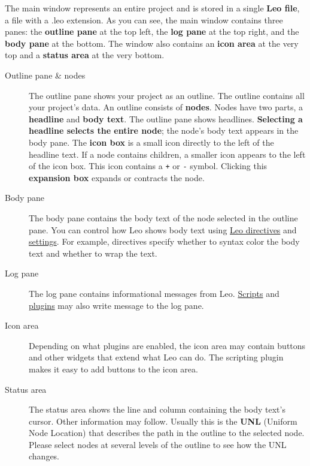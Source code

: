 \documentclass[10pt,a4paper,english]{article}
\begin{document}
The main window represents an entire project and is stored in a single \textbf{Leo file},
a file with a .leo extension.
As you can see, the main window contains three panes:
the \textbf{outline pane} at the top left,
the \textbf{log pane} at the top right, and the \textbf{body pane} at the bottom.
The window also contains an \textbf{icon area} at the very top and a \textbf{status area} at the very bottom.
\begin{description}
\item[{Outline pane {\&} nodes}] %

The outline pane shows your project as an outline.
The outline contains all your project's data.
An outline consists of \textbf{nodes}.
Nodes have two parts, a \textbf{headline} and \textbf{body text}.
The outline pane shows headlines.
\textbf{Selecting a headline selects the entire node}; the node's body text appears in the body pane.
The \textbf{icon box} is a small icon directly to the left of the headline text.
If a node contains children, a smaller icon appears to the left of the icon box.
This icon contains a \texttt{+} or \texttt{-} symbol.
Clicking this \textbf{expansion box} expands or contracts the node.

\item[{Body pane}] %

The body pane contains the body text of the node selected in the outline pane.
You can control how Leo shows body text using \href{\#leo-directives}{Leo directives} and \href{\#plugins-settings}{settings}.
For example, directives specify whether to syntax color the body text and whether to wrap the text.

\item[{Log pane}] %

The log pane contains informational messages from Leo.
\href{\#scripting-leo}{Scripts} and \href{\#plugins-settings}{plugins} may also write message to the log pane.

\item[{Icon area}] %

Depending on what plugins are enabled,
the icon area may contain buttons and other widgets that extend what Leo can do.
The scripting plugin makes it easy to add buttons to the icon area.

\item[{Status area}] %

The status area shows the line and column containing the body text's cursor.
Other information may follow.
Usually this is the \textbf{UNL} (Uniform Node Location) that describes the path in the outline
to the selected node.
Please select nodes at several levels of the outline to see how the UNL changes.

\end{description}
\end{document}
